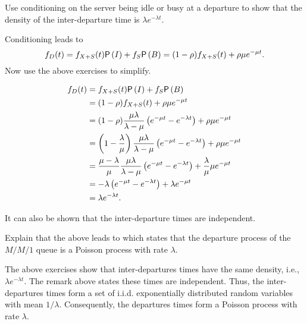 \begin{exercise}
Use conditioning on the server being idle or busy at a departure to show that  the density of  the inter-departure time is $\lambda e^{-\lambda t}$.
  \begin{hint}
Conditioning leads to 
\begin{equation*}
    f_D(t) = f_{X+S}(t) \P{I} + f_S \P B = (1-\rho) f_{X+S}(t) +
    \rho \mu e^{-\mu t}.
\end{equation*}
    Now use the above exercises to simplify.
  \end{hint}
  \begin{solution}
       \begin{align*}
    f_D(t) 
&= f_{X+S}(t) \P I + f_S \P B \\
&= (1-\rho) f_{X+S}(t) +    \rho \mu e^{-\mu t} \\
&= (1-\rho) \frac{\mu\lambda}{\lambda-\mu} \left(e^{-\mu t}-e^{-\lambda t}\right) +    \rho \mu e^{-\mu t} \\
&= \left(1-\frac{\lambda}\mu\right) \frac{\mu\lambda}{\lambda-\mu}\left(e^{-\mu t}-e^{-\lambda t}\right)  +    \rho \mu e^{-\mu t} \\
&= \frac{\mu-\lambda}\mu \frac{\mu\lambda}{\lambda-\mu}\left(e^{-\mu t}-e^{-\lambda t}\right)  +    \frac\lambda \mu \mu e^{-\mu t} \\
&= - \lambda\left(e^{-\mu t}-e^{-\lambda t}\right)  +    \lambda e^{-\mu t} \\
&=  \lambda e^{-\lambda t}.
      \end{align*}
  \end{solution}
\end{exercise}

It can also be shown that the inter-departure times are independent. 

\begin{exercise}\label{ex:burke}
Explain that the above leads to   which states that the departure process of the $M/M/1$ queue is a Poisson  process with rate $\lambda$. 
\begin{solution}
The above exercises show that inter-departures times have the same density, i.e., $\lambda e^{-\lambda t}$. The remark above states these times are independent. Thus,  the inter-departures times form a set of i.i.d. exponentially distributed random variables with mean $1/\lambda$. Consequently, the departures times form a Poisson process with rate $\lambda$.
\end{solution}
\end{exercise}







